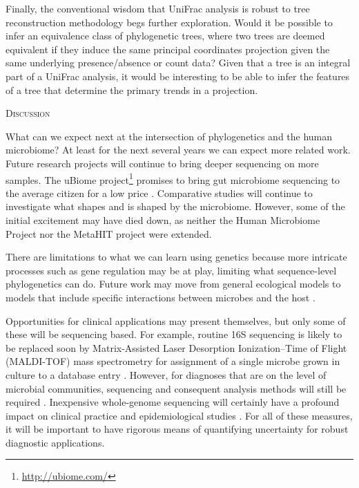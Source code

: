 \documentclass{amsart}
\renewcommand{\section}[1]{%
\bigskip
\begin{center}
\begin{Large}
\normalfont\scshape #1
\medskip
\end{Large}
\end{center}}
\begin{document}
Finally, the conventional wisdom that UniFrac analysis is robust to tree reconstruction methodology begs further exploration.
Would it be possible to infer an equivalence class of phylogenetic trees, where two trees are deemed equivalent if they induce the same principal coordinates projection given the same underlying presence/absence or count data?
Given that a tree is an integral part of a UniFrac analysis, it would be interesting to be able to infer the features of a tree that determine the primary trends in a projection.


\section{Discussion}
What can we expect next at the intersection of phylogenetics and the human microbiome?
At least for the next several years we can expect more related work.
Future research projects will continue to bring deeper sequencing on more samples.
The uBiome project\footnote{\url{http://ubiome.com/}} promises to bring gut microbiome sequencing to the average citizen for a low price \citep{costandi2013citizen}.
Comparative studies will continue to investigate what shapes and is shaped by the microbiome.
However, some of the initial excitement may have died down, as neither the Human Microbiome Project nor the MetaHIT project were extended.

There are limitations to what we can learn using genetics because more intricate processes such as gene regulation may be at play, limiting what sequence-level phylogenetics can do.
Future work may move from general ecological models to models that include specific interactions between microbes and the host \citep[reviewed in][]{hooper2012interactions}.

Opportunities for clinical applications may present themselves, but only some of these will be sequencing based.
For example, routine 16S sequencing is likely to be replaced soon by Matrix-Assisted Laser Desorption Ionization--Time of Flight (MALDI-TOF) mass spectrometry for assignment of a single microbe grown in culture to a database entry \citep{clark2013matrix}.
However, for diagnoses that are on the level of microbial communities, sequencing and consequent analysis methods will still be required \citep[reviewed in][]{Rogers2013271}.
Inexpensive whole-genome sequencing will certainly have a profound impact on clinical practice and epidemiological studies \citep{didelot2012transforming}.
For all of these measures, it will be important to have rigorous means of quantifying uncertainty for robust diagnostic applications.
\end{document}
